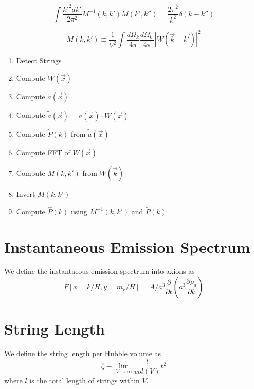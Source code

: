 \documentclass[a4paper]{article}
\begin{document}
\begin{equation}
    \int \frac{k'^2 d k'}{2 \pi^2} M^{-1}(k, k') M(k', k'') = \frac{2\pi^2}{k^2} \delta(k - k'')
\end{equation}

\begin{equation}
    M(k, k') \equiv \frac{1}{V^2} \int \frac{d \Omega_k}{4 \pi} \frac{d \Omega_{k'}}{4 \pi} \left| W(\vec{k} - \vec{k'}) \right|^2
\end{equation}

\begin{enumerate}
    \item Detect Strings
    \item Compute $W(\vec{x})$
    \item Compute $\dot{a}(\vec{x})$
    \item Compute $\tilde{\dot{a}}(\vec{x}) = a(\vec{x}) \cdot W(\vec{x})$
    \item Compute $\tilde{P}(k)$ from $\tilde{\dot{a}}(\vec{x})$
    \item Compute FFT of $W(\vec{x})$
    \item Compute $M(k, k')$ from $W(\vec{k})$
    \item Invert $M(k, k')$
    \item Compute $\hat{P}(k)$ using $M^{-1}(k, k')$ and $\tilde{P}(k)$
\end{enumerate}

\section{Instantaneous Emission Spectrum}
We define the instantaeous emission spectrum into axions as
\begin{equation}
    F[x = k / H, y = m_r / H] = A / a^3 \frac{\partial}{\partial t} \left( a^3 \frac{\partial \rho_a}{\partial k} \right)
\end{equation}

\section{String Length}

We define the string length per Hubble volume as
\begin{equation}
    \zeta \equiv \lim_{V \to \infty} \frac{l}{vol(V)} t^2
\end{equation}
where $l$ is the total length of strings within $V$.


\newpage
\printbibliography
\end{document}
